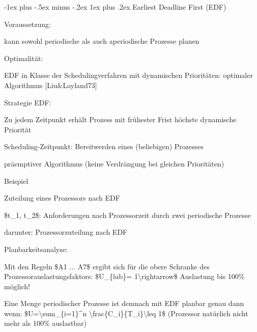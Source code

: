 \documentclass[a4paper]{article}
\makeatletter
\renewcommand{\subsubsection}{\@startsection{subsubsection}{3}{0mm}%
 {-1ex plus -.5ex minus -.2ex}%
 {1ex plus .2ex}%
 {\normalfont\small\bfseries}}
\makeatother
\begin{document}
\begin{multicols}{3}
    \subsubsection{Earliest Deadline First (EDF)}
    \begin{itemize*}
        \item Voraussetzung:
        \begin{itemize*}
            \item kann sowohl periodische als auch aperiodische Prozesse planen
        \end{itemize*}
        \item Optimalität:
        \begin{itemize*}
            \item EDF in Klasse der Schedulingverfahren mit dynamischen Prioritäten: optimaler Algorithmus {[}Liu\&Layland73{]}
        \end{itemize*}
        \item Strategie EDF:
        \begin{itemize*}
            \item Zu jedem Zeitpunkt erhält Prozess mit frühester Frist höchste dynamische Priorität
            \item Scheduling-Zeitpunkt: Bereitwerden eines (beliebigen) Prozesses
            \item präemptiver Algorithmus (keine Verdrängung bei gleichen Prioritäten)
        \end{itemize*}
        \item Beispiel
        \begin{itemize*}
            \item Zuteilung eines Prozessors nach EDF
            \item \$t\_1, t\_2\$: Anforderungen nach Prozessorzeit durch zwei periodische Prozesse
            \item darunter: Prozessorzuteilung nach EDF
        \end{itemize*}
        \item Planbarkeitsanalyse:
        \begin{itemize*}
            \item Mit den Regeln \$A1 ... A7\$ ergibt sich für die obere Schranke des Prozessorauslastungsfaktors: \$U\_\{lub\}= 1\textbackslash rightarrow\$ Auslastung bis 100\% möglich!
            \item Eine Menge periodischer Prozesse ist demnach mit EDF planbar genau dann wenn: \$U=\textbackslash sum\_\{i=1\}\^{}n \textbackslash frac\{C\_i\}\{T\_i\}\textbackslash leq 1\$ (Prozessor natürlich nicht mehr als 100\% auslastbar)

\end{itemize*}
\end{itemize*}
\end{multicols}
\end{document}
